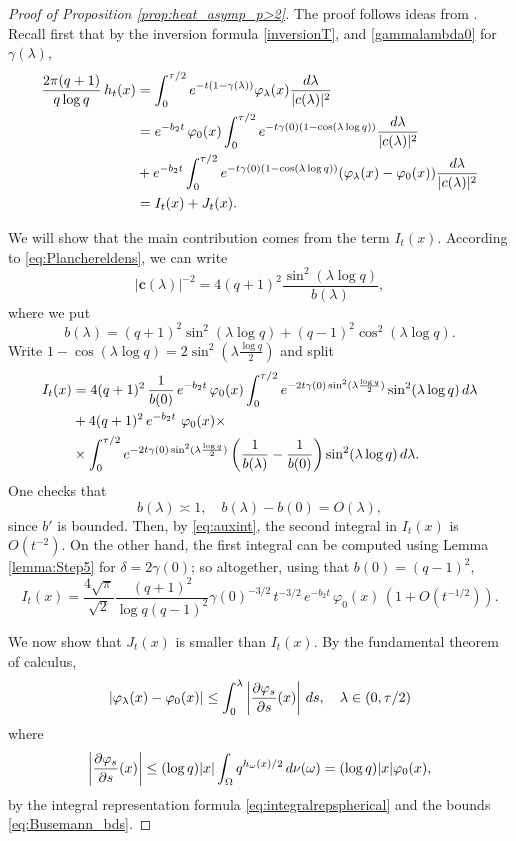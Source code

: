 \documentclass[10pt,a4paper]{amsart}
\def\int{\intop\nolimits}
\theoremstyle{plain}
\theoremstyle{remark}
\theoremstyle{definition}
\begin{document}
	\begin{proof}[Proof of Proposition \ref{prop:heat_asymp_p>2}]
		The proof follows ideas from \cite[Step 5]{AJ99}. Recall first that by the inversion formula \eqref{inversionT}, and \eqref{gammalambda0} for $\gamma(\lambda)$,
		\begin{align}
			\frac{2\pi(q+1)}{q\log q}\, h_t(x)&=\int_{0}^{\tau /2}e^{-t(1-\gamma(\lambda))}\varphi_{\lambda}(x)\frac{d \lambda}{|\textbf{c}(\lambda)|^2} \quad \notag\\
			&=e^{-b_2t}\, \varphi_0(x)\int_{0}^{\tau /2}e^{-t\gamma(0)(1-\cos(\lambda \log q))}\frac{d \lambda}{|\textbf{c}(\lambda)|^2} \notag\\
			&+e^{-b_2t}\int_{0}^{\tau /2}e^{-t\gamma(0)(1-\cos(\lambda \log q))}(\varphi_{\lambda}(x)-\varphi_0(x))\frac{d \lambda}{|\textbf{c}(\lambda)|^2} \notag \\
			&=I_t(x)+J_t(x). \label{eq:I+J}
		\end{align}	
		
        We will show that the main contribution comes from the term  $I_t(x)$.
		According to \eqref{eq:Planchereldens}, we can write 
		\[
		|\textbf{c}(\lambda)|^{-2}=4(q+1)^2\frac{\sin^2(\lambda \log q)}{b(\lambda)}, 
        \]
        where we put
        \[b(\lambda)=(q+1)^2\sin ^2(\lambda \log q)+(q-1)^2 \cos ^2(\lambda \log q).
		\]
		Write $1-\cos(\lambda \log q)=2\sin^2(\lambda\frac{\log q}{2})$ and split
		\begin{align*}
			I_t(x)&=4(q+1)^2\,\frac{1}{b(0)}\,e^{-b_2t}\, \varphi_0(x)\int_0^{\tau/2}e^{-2t\gamma(0)\sin^2(\lambda \frac{\log q}{2})}\sin^2(\lambda \log q)\, d\lambda \\
			&+4(q+1)^2\,e^{-b_2t}\ \varphi_0(x) \times\\
            &\times\int_0^{\tau/2}e^{-2t\gamma(0)\sin^2(\lambda \frac{\log q}{2})}\left(\frac{1}{b(\lambda)}-\frac{1}{b(0)}\right)\sin^2(\lambda \log q)\, d\lambda.
		\end{align*}
		One checks that $$b(\lambda)\asymp 1, \quad b(\lambda)-b(0)=O(\lambda),$$ since $b'$ is bounded. Then, by \eqref{eq:auxint}, the second integral in $I_t(x)$ is $O(t^{-2})$. On the other hand, the first integral can be computed using Lemma \ref{lemma:Step5} for $\delta=2\gamma(0)$;  so altogether, using that $b(0)=(q-1)^2$,
		\[
		I_t(x)=\frac{4\sqrt{\pi}}{\sqrt{2}}\frac{(q+1)^2}{\log q(q-1)^2}\gamma(0)^{-3/2}\,t^{-3/2}\, e^{-b_2t}\, \varphi_0(x)\,(1+O(t^{-1/2})).
		\]
		
		We now show that $J_t(x)$  is smaller than $I_t(x)$. 
		By the fundamental theorem of calculus,
\[
|\varphi_\lambda(x)-\varphi_0(x)|
\leq
\int_0^\lambda
\left|\frac{\partial\varphi_s}{\partial s}(x)\right|\,ds, \quad \lambda\in (0, \tau/2)
\]
where
$$\left|\frac{\partial\varphi_s}{\partial s}(x)\right|
\leq
(\log q)|x|
\int_\Omega q^{h_\omega(x)/2}\,d\nu(\omega)
=
(\log q)|x|\varphi_0(x),$$
		 by the integral representation formula \eqref{eq:integralrepspherical} and the bounds \eqref{eq:Busemann_bds}.
        

\end{proof}
\end{document}

